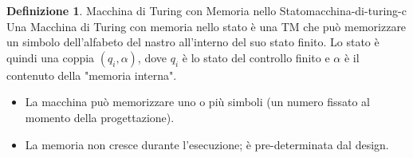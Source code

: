 \documentclass[a4paper]{article}
\theoremstyle{definition} %
\newtheorem{definition}{Definizione}
\begin{document}
\begin{definition}{Macchina di Turing con Memoria nello Stato}{macchina-di-turing-c}
Una Macchina di Turing con memoria nello stato è una TM che può memorizzare un simbolo dell'alfabeto del nastro all'interno del suo stato finito. Lo stato è quindi una coppia $(q_i, \alpha)$, dove $q_i$ è lo stato del controllo finito e $\alpha$ è il contenuto della "memoria interna".
\begin{itemize}
    \item La macchina può memorizzare uno o più simboli (un numero fissato al momento della progettazione).
    \item La memoria non cresce durante l'esecuzione; è pre-determinata dal design.
\end{itemize}
\end{definition}
\end{document}
